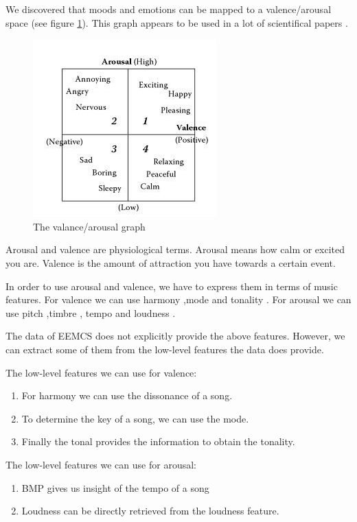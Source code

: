 \documentclass[10pt,a4paper]{article}
\begin{document}
We discovered that moods and emotions can be mapped to a valence/arousal space (see figure \ref{fig:avgraph}).
This graph appears to be used in a lot of scientifical papers \cite{Kosina} \cite{McVicar}.

\begin{figure}[h]
\includegraphics[scale=0.75]{avgraph.jpg}
\caption{The valance/arousal graph \cite{Book}}
\label{fig:avgraph}

\end{figure}

Arousal and valence are physiological terms.
Arousal means how calm or excited you are.
Valence is the amount of attraction you have towards a certain event.

In order to use arousal and valence, we have to express them in terms of music features.
For valence we can use harmony \cite{PresentationMER},mode  \cite{PresentationMER} and tonality  \cite{PresentationMER}.
For arousal we can use pitch \cite{PresentationMER} ,timbre \cite{PresentationMER}, tempo \cite{PresentationMER} and loudness \cite{PaperME}.

\newpage

The data of EEMCS does not explicitly provide the above features. However, we can extract some of them from the low-level features the data does provide.

The low-level features we can use for valence:
\begin{enumerate}
\item For harmony we can use the dissonance of a song.
\item To determine the key of a song, we can use the mode.
\item Finally the tonal provides the information to obtain the tonality.
\end{enumerate}
The low-level features we can use for arousal:
\begin{enumerate}
\item BMP gives us insight of the tempo of a song
\item Loudness can be directly retrieved from the loudness feature.
\end{enumerate}
\end{document}
